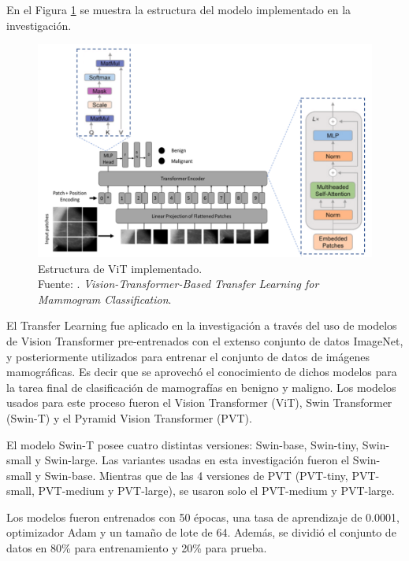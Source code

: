 En el Figura \ref{2:fig109} se muestra la estructura del modelo implementado en la investigación.

\begin{figure}[H]
	\begin{center}
		\includegraphics[width=1.00\textwidth]{2/figures/vitpaper2_part2.png}
		\caption[Estructura de ViT implementado]{Estructura de ViT implementado. \\
		Fuente: \cite{pr_ayana2023ViTtrasnferLMC}. \textit{Vision-Transformer-Based Transfer Learning for Mammogram Classification}.}
		\label{2:fig109}
	\end{center}
\end{figure}

El Transfer Learning fue aplicado en la investigación a través del uso de modelos de Vision Transformer pre-entrenados con el extenso conjunto de datos ImageNet, y posteriormente utilizados para entrenar el conjunto de datos de imágenes mamográficas. Es decir que se aprovechó el conocimiento de dichos modelos para la tarea final de clasificación de mamografías en benigno y maligno. Los modelos usados para este proceso fueron el Vision Transformer (ViT), Swin Transformer (Swin-T) y el Pyramid Vision Transformer (PVT).

El modelo Swin-T posee cuatro distintas versiones: Swin-base, Swin-tiny, Swin-small y Swin-large. Las variantes usadas en esta investigación fueron el Swin-small y Swin-base. Mientras que de las 4 versiones de PVT (PVT-tiny, PVT-small, PVT-medium y PVT-large), se usaron solo el PVT-medium y PVT-large.

Los modelos fueron entrenados con 50 épocas, una tasa de aprendizaje de 0.0001, optimizador Adam y un tamaño de lote de 64. Además, se dividió el conjunto de datos en 80\% para entrenamiento y 20\% para prueba.

